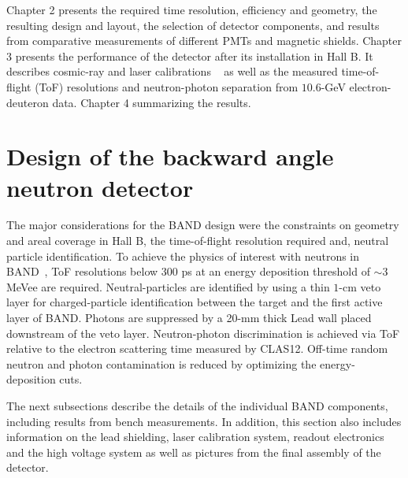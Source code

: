 \documentclass[3p,final,twocolumn]{elsarticle}
\begin{document}
Chapter 2 presents the required time
resolution, efficiency and geometry, the resulting design and layout, the selection of detector
components, and results from comparative 
measurements of different PMTs and magnetic shields. Chapter 3
presents the performance of the detector after its installation in
Hall B. It describes cosmic-ray and laser calibrations
~\cite{band-laser} as well as the measured
time-of-flight (ToF) resolutions and neutron-photon separation from
$10.6$-\si{\GeV} electron-deuteron data. Chapter 4  summarizing the results.



\section{Design of the backward angle neutron detector}
The major considerations for the BAND design were the constraints on
geometry and areal coverage in Hall B, the time-of-flight
resolution required
and, neutral particle identification.  To achieve the physics of
interest with neutrons in BAND~\cite{band-proposal}, ToF
resolutions below $300$ \si{\pico\second} at an energy deposition
threshold of $\sim 3$ MeVee are required. Neutral-particles are 
identified by using a thin $1$-\si{\centi\meter} veto layer for charged-particle identification
between the target and the first active layer of BAND. Photons are
suppressed by a 20-\si{\milli\meter} thick Lead wall placed downstream 
of the veto layer. Neutron-photon discrimination is achieved via ToF
relative to the electron scattering time measured by CLAS12. Off-time
random neutron and photon contamination is reduced by optimizing the
energy-deposition cuts.

The next subsections describe the details of the individual BAND components,
including results from bench measurements. In addition,
this section also includes information on the lead shielding, laser
calibration system, readout electronics and the high voltage system as
well as pictures from the final assembly of the detector.
\end{document}
